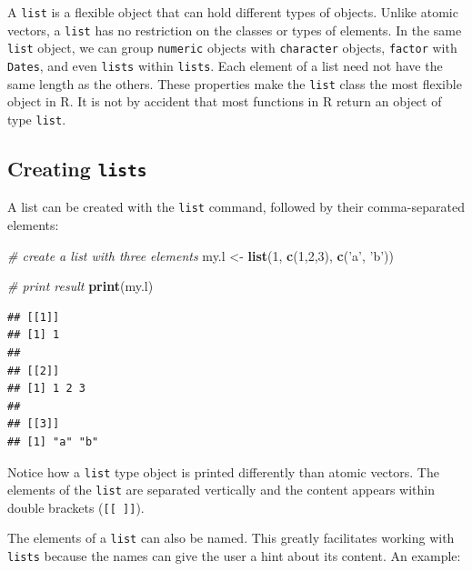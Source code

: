 \documentclass[11pt,]{book}
\newenvironment{Shaded}{\begin{snugshade}}{\end{snugshade}}
\newcommand{\KeywordTok}[1]{\textcolor[rgb]{0.27,0.27,0.27}{\textbf{#1}}}
\newcommand{\DecValTok}[1]{\textcolor[rgb]{0.06,0.06,0.06}{#1}}
\newcommand{\StringTok}[1]{\textcolor[rgb]{0.5,0.5,0.5}{#1}}
\newcommand{\CommentTok}[1]{\textcolor[rgb]{0.56,0.35,0.01}{\textit{#1}}}
\newcommand{\NormalTok}[1]{#1}
\begin{document}
A \texttt{list} is a flexible object that can hold different types of
objects. Unlike atomic vectors, a \texttt{list} has no restriction on
the classes or types of elements. In the same \texttt{list} object, we
can group \texttt{numeric} objects with \texttt{character} objects,
\texttt{factor} with \texttt{Dates}, and even \texttt{lists} within
\texttt{lists}. Each element of a list need not have the same length as
the others. These properties make the \texttt{list} class the most
flexible object in R. It is not by accident that most functions in R
return an object of type \texttt{list}. 

\subsection{\texorpdfstring{Creating
\texttt{lists}}{Creating lists}}\label{creating-lists}

A list can be created with the \texttt{list} command, followed by their
comma-separated elements: 

\begin{Shaded}
\begin{Highlighting}[]
\CommentTok{# create a list with three elements}
\NormalTok{my.l <-}\StringTok{ }\KeywordTok{list}\NormalTok{(}\DecValTok{1}\NormalTok{, }\KeywordTok{c}\NormalTok{(}\DecValTok{1}\NormalTok{,}\DecValTok{2}\NormalTok{,}\DecValTok{3}\NormalTok{), }\KeywordTok{c}\NormalTok{(}\StringTok{'a'}\NormalTok{, }\StringTok{'b'}\NormalTok{))}

\CommentTok{# print result}
\KeywordTok{print}\NormalTok{(my.l)}
\end{Highlighting}
\end{Shaded}

\begin{verbatim}
## [[1]]
## [1] 1
## 
## [[2]]
## [1] 1 2 3
## 
## [[3]]
## [1] "a" "b"
\end{verbatim}

Notice how a \texttt{list} type object is printed differently than
atomic vectors. The elements of the \texttt{list} are separated
vertically and the content appears within double brackets
(\texttt{{[}{[}\ {]}{]}}).

The elements of a \texttt{list} can also be named. This greatly
facilitates working with \texttt{lists} because the names can give the
user a hint about its content. An example:
\end{document}
